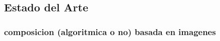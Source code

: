 \subsection{Estado del Arte}
\label{sec:estadodelarte}



\subsubsection{composicion (algoritmica o no) basada en imagenes}


